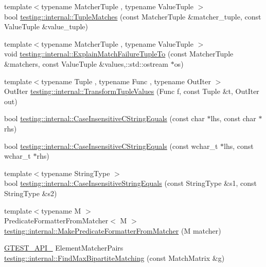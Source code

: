 \begin{DoxyCompactItemize}
\item 
{\footnotesize template$<$typename Matcher\+Tuple , typename Value\+Tuple $>$ }\\bool \hyperlink{namespacetesting_1_1internal_a10095d1e1c99369200072b39d657ebc4}{testing\+::internal\+::\+Tuple\+Matches} (const Matcher\+Tuple \&matcher\+\_\+tuple, const Value\+Tuple \&value\+\_\+tuple)
\item 
{\footnotesize template$<$typename Matcher\+Tuple , typename Value\+Tuple $>$ }\\void \hyperlink{namespacetesting_1_1internal_afc791c20a43da984032e598698ac6ac4}{testing\+::internal\+::\+Explain\+Match\+Failure\+Tuple\+To} (const Matcher\+Tuple \&matchers, const Value\+Tuple \&values,\+::std\+::ostream $\ast$os)
\item 
{\footnotesize template$<$typename Tuple , typename Func , typename Out\+Iter $>$ }\\Out\+Iter \hyperlink{namespacetesting_1_1internal_a07ba091a64aa2ba95e41accc55dc8855}{testing\+::internal\+::\+Transform\+Tuple\+Values} (Func f, const Tuple \&t, Out\+Iter out)
\item 
bool \hyperlink{namespacetesting_1_1internal_aebfd0cd34de52d7973a5b2d03ba848cf}{testing\+::internal\+::\+Case\+Insensitive\+C\+String\+Equals} (const char $\ast$lhs, const char $\ast$rhs)
\item 
bool \hyperlink{namespacetesting_1_1internal_ad5b31f61a3cc5b4226d3560f5b48f4dd}{testing\+::internal\+::\+Case\+Insensitive\+C\+String\+Equals} (const wchar\+\_\+t $\ast$lhs, const wchar\+\_\+t $\ast$rhs)
\item 
{\footnotesize template$<$typename String\+Type $>$ }\\bool \hyperlink{namespacetesting_1_1internal_a383de24b1cca6648c14b03964c0ed843}{testing\+::internal\+::\+Case\+Insensitive\+String\+Equals} (const String\+Type \&s1, const String\+Type \&s2)
\item 
{\footnotesize template$<$typename M $>$ }\\Predicate\+Formatter\+From\+Matcher$<$ M $>$ \hyperlink{namespacetesting_1_1internal_a3fd0f30ec03d577bba3e1aa13241e17d}{testing\+::internal\+::\+Make\+Predicate\+Formatter\+From\+Matcher} (M matcher)
\item 
\hyperlink{gtest-port_8h_aa73be6f0ba4a7456180a94904ce17790}{G\+T\+E\+S\+T\+\_\+\+A\+P\+I\+\_\+} Element\+Matcher\+Pairs \hyperlink{namespacetesting_1_1internal_ae30bd8357c179334b2b09b0d689efccc}{testing\+::internal\+::\+Find\+Max\+Bipartite\+Matching} (const Match\+Matrix \&g)
\item 

\end{DoxyCompactItemize}
